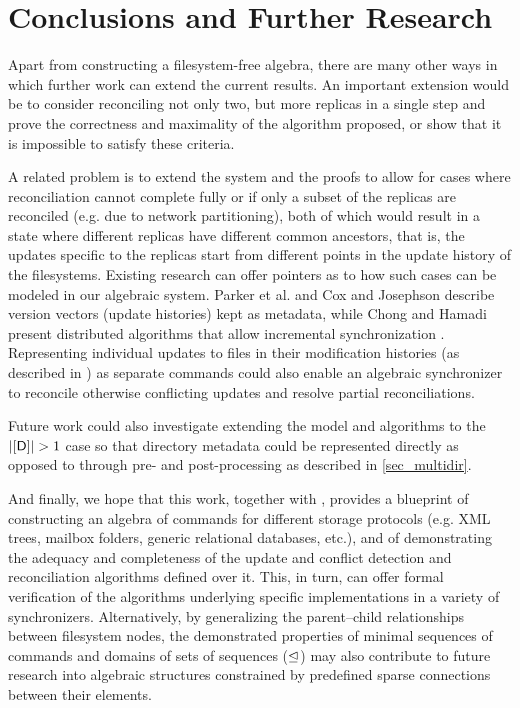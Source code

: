 
\section{Conclusions and Further Research}

Apart from constructing a filesystem-free algebra,
there are many other ways in which further work can extend the current results.
An important extension would be to
consider reconciling not only two, but more replicas in a single step and
prove the correctness and maximality of the algorithm proposed,
or show that it is impossible to satisfy these criteria.

A related problem is to extend the system and the proofs
to allow for cases where reconciliation cannot
complete fully
or if only a subset of the replicas are reconciled 
(e.g. due to network partitioning),
both of which would result in a state where different replicas
have different common ancestors, that is,
the updates specific to the replicas start from different points
in the update history of the filesystems.
Existing research can offer pointers as to how such cases can be modeled
in our algebraic system.
Parker et al. \cite{PPRS} and Cox and Josephson \cite{CJ}
describe version vectors (update histories) kept as metadata,
while Chong and Hamadi present distributed algorithms that allow incremental synchronization \cite{CH}.
Representing individual updates to files
in their modification histories (as described in \cite{CJ})
as separate commands could also enable an algebraic synchronizer to reconcile otherwise
conflicting updates and resolve partial reconciliations.

Future work could also investigate extending the 
model and algorithms to the $|\setd|>1$ case
so that directory metadata could be represented directly
as opposed to through pre- and post-processing as described
in \cref{sec_multidir}.

And finally, we hope that this work, together with \cite{NREC}, provides
a blueprint of constructing an algebra of commands for different storage protocols
(e.g. XML trees, mailbox folders, generic relational databases, etc.),
and of demonstrating the adequacy and completeness of the update and conflict detection and reconciliation
algorithms defined over it.
This, in turn, can offer formal verification of the algorithms underlying
specific implementations in a variety of synchronizers.
Alternatively, by generalizing the parent--child relationships between filesystem nodes,
the demonstrated properties of minimal sequences of commands
and domains of sets of sequences ($\trianglelefteq$)
may also contribute to future research into algebraic structures
constrained by predefined sparse connections between their elements.
